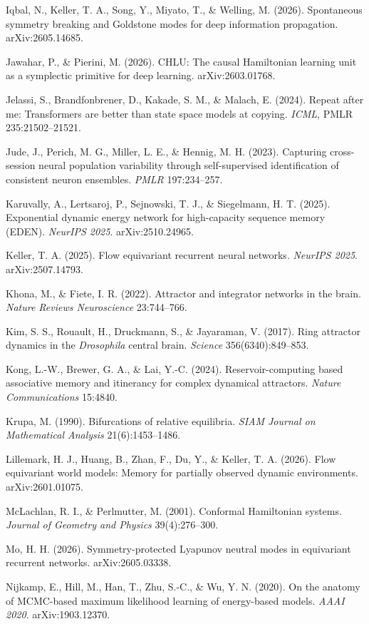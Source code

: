 \documentclass{article}
\begin{document}
Iqbal, N., Keller, T. A., Song, Y., Miyato, T., \& Welling, M. (2026). Spontaneous symmetry breaking and Goldstone modes for deep information propagation. arXiv:2605.14685.

Jawahar, P., \& Pierini, M. (2026). CHLU: The causal Hamiltonian learning unit as a symplectic primitive for deep learning. arXiv:2603.01768.

Jelassi, S., Brandfonbrener, D., Kakade, S. M., \& Malach, E. (2024). Repeat after me: Transformers are better than state space models at copying. \emph{ICML}, PMLR 235:21502--21521.

Jude, J., Perich, M. G., Miller, L. E., \& Hennig, M. H. (2023). Capturing cross-session neural population variability through self-supervised identification of consistent neuron ensembles. \emph{PMLR} 197:234--257.

Karuvally, A., Lertsaroj, P., Sejnowski, T. J., \& Siegelmann, H. T. (2025). Exponential dynamic energy network for high-capacity sequence memory (EDEN). \emph{NeurIPS 2025}. arXiv:2510.24965.

Keller, T. A. (2025). Flow equivariant recurrent neural networks. \emph{NeurIPS 2025}. arXiv:2507.14793.

Khona, M., \& Fiete, I. R. (2022). Attractor and integrator networks in the brain. \emph{Nature Reviews Neuroscience} 23:744--766.

Kim, S. S., Rouault, H., Druckmann, S., \& Jayaraman, V. (2017). Ring attractor dynamics in the \emph{Drosophila} central brain. \emph{Science} 356(6340):849--853.

Kong, L.-W., Brewer, G. A., \& Lai, Y.-C. (2024). Reservoir-computing based associative memory and itinerancy for complex dynamical attractors. \emph{Nature Communications} 15:4840.

Krupa, M. (1990). Bifurcations of relative equilibria. \emph{SIAM Journal on Mathematical Analysis} 21(6):1453--1486.

Lillemark, H. J., Huang, B., Zhan, F., Du, Y., \& Keller, T. A. (2026). Flow equivariant world models: Memory for partially observed dynamic environments. arXiv:2601.01075.

McLachlan, R. I., \& Perlmutter, M. (2001). Conformal Hamiltonian systems. \emph{Journal of Geometry and Physics} 39(4):276--300.

Mo, H. H. (2026). Symmetry-protected Lyapunov neutral modes in equivariant recurrent networks. arXiv:2605.03338.

Nijkamp, E., Hill, M., Han, T., Zhu, S.-C., \& Wu, Y. N. (2020). On the anatomy of MCMC-based maximum likelihood learning of energy-based models. \emph{AAAI 2020}. arXiv:1903.12370.
\end{document}
